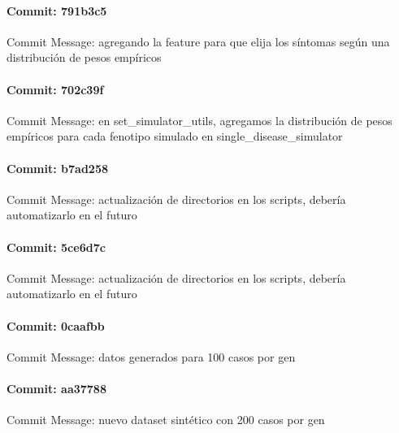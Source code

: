 \documentclass{article}
\begin{document}
\paragraph{Commit: 791b3c5}
Commit Message: agregando la feature para que elija los síntomas según una distribución de pesos empíricos

\paragraph{Commit: 702c39f}
Commit Message: en set_simulator_utils, agregamos la distribución de pesos empíricos para cada fenotipo simulado en single_disease_simulator

\paragraph{Commit: b7ad258}
Commit Message: actualización de directorios en los scripts, debería automatizarlo en el futuro

\paragraph{Commit: 5ce6d7c}
Commit Message: actualización de directorios en los scripts, debería automatizarlo en el futuro

\paragraph{Commit: 0caafbb}
Commit Message: datos generados para 100 casos por gen

\paragraph{Commit: aa37788}
Commit Message: nuevo dataset sintético con 200 casos por gen

\end{document}
